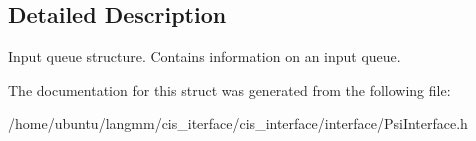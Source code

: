 \subsection{Detailed Description}
Input queue structure. Contains information on an input queue. 

The documentation for this struct was generated from the following file\+:\begin{DoxyCompactItemize}
\item 
/home/ubuntu/langmm/cis\+\_\+iterface/cis\+\_\+interface/interface/Psi\+Interface.\+h\end{DoxyCompactItemize}
